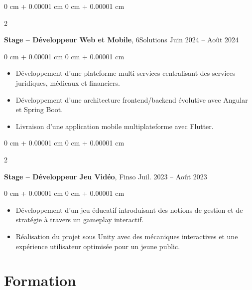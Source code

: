 \documentclass[10pt, letterpaper]{article}
\newenvironment{highlights}{
    \begin{itemize}[
        topsep=0.10 cm,
        parsep=0.10 cm,
        partopsep=0pt,
        itemsep=0pt,
        leftmargin=0 cm + 10pt
    ]
}{
    \end{itemize}
} %
\newenvironment{onecolentry}{
    \begin{adjustwidth}{
        0 cm + 0.00001 cm
    }{
        0 cm + 0.00001 cm
    }
}{
    \end{adjustwidth}
} %
\newenvironment{twocolentry}[2][]{
    \onecolentry
    \def\secondColumn{#2}
    \setcolumnwidth{\fill, 4.5 cm}
    \begin{paracol}{2}
}{
    \switchcolumn \raggedleft \secondColumn
    \end{paracol}
    \endonecolentry
} %
\begin{document}
        \vspace{0.2 cm}

        \begin{twocolentry}{
            Juin 2024 – Août 2024
        }
            \textbf{Stage – Développeur Web et Mobile}, 6Solutions\end{twocolentry}

        \vspace{0.10 cm}
        \begin{onecolentry}
            \begin{highlights}
\item Développement d’une plateforme multi-services centralisant des services juridiques, médicaux et financiers.
    \item Développement d’une architecture frontend/backend évolutive avec Angular et Spring Boot.
    \item Livraison d’une application mobile multiplateforme avec Flutter.
    
            \end{highlights}
        \end{onecolentry}



        \vspace{0.2 cm}

        \begin{twocolentry}{
            Juil. 2023 – Août 2023
        }
            \textbf{Stage – Développeur Jeu Vidéo}, Finso\end{twocolentry}

        \vspace{0.10 cm}
        \begin{onecolentry}
            \begin{highlights}
                \item Développement d’un jeu éducatif introduisant des notions de gestion et de stratégie à travers un gameplay interactif.
                \item Réalisation du projet sous Unity avec des mécaniques interactives et une expérience utilisateur optimisée pour un jeune public.
            \end{highlights}
        \end{onecolentry}
    \section{Formation}
\end{document}
